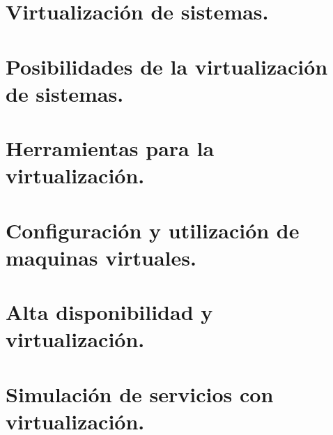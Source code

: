 \documentclass[letterpaper,10pt,spanish]{sphinxmanual}
\begin{document}
\section{Virtualización de sistemas.}
\label{\detokenize{tema_sad/tema_sad:virtualizacion-de-sistemas}}

\section{Posibilidades de la virtualización de sistemas.}
\label{\detokenize{tema_sad/tema_sad:posibilidades-de-la-virtualizacion-de-sistemas}}

\section{Herramientas para la virtualización.}
\label{\detokenize{tema_sad/tema_sad:herramientas-para-la-virtualizacion}}

\section{Configuración y utilización de maquinas virtuales.}
\label{\detokenize{tema_sad/tema_sad:configuracion-y-utilizacion-de-maquinas-virtuales}}

\section{Alta disponibilidad y virtualización.}
\label{\detokenize{tema_sad/tema_sad:alta-disponibilidad-y-virtualizacion}}

\section{Simulación de servicios con virtualización.}
\label{\detokenize{tema_sad/tema_sad:simulacion-de-servicios-con-virtualizacion}}


\renewcommand{\indexname}{Índice}
\printindex
\end{document}
